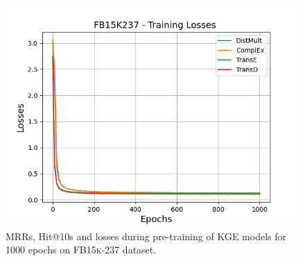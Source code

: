 \begin{figure}
\begin{minipage}{.3\textwidth}
      \includegraphics[width=\linewidth]{figures/results/pretrain/fb15k237/pretrain_fb15k237_losses.png}
    \end{minipage}%
    \caption{MRRs, Hit@10s and losses during pre-training of \ac{KGE} models for 1000 epochs on \textsc{FB15k-237} dataset.}
    \label{fig:pretraining}
\end{figure}
